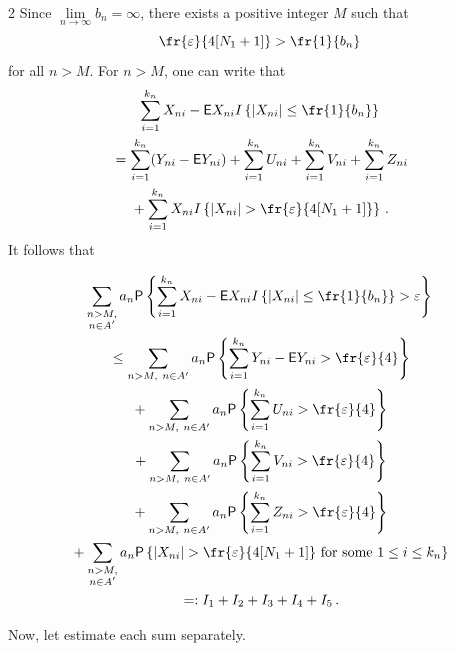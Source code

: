 \begin{multicols}{2}
Since $\lim\limits_{n\to\infty}b_n=\infty$, there exists a positive integer $M$ such that
$$
\fr{\varepsilon}{4[N_1+1]}>\fr{1}{b_n}
$$
for all $n>M$. For $n>M$,  one can write that
\begin{multline*} 
\sum\limits_{i=1}^{k_n} X_{ni}- {\sf E}X_{ni}I\left\{|X_{ni}|\le \fr{1}{b_n}\right\}\\
{} = \sum\limits_{i=1}^{k_n}(Y_{ni}-{\sf E}Y_{ni})+ \sum\limits_{i=1}^{k_n} U_{ni} + 
\sum\limits_{i=1}^{k_n} V_{ni}+ \sum\limits_{i=1}^{k_n} Z_{ni}\\
{}+\sum\limits_{i=1}^{k_n} X_{ni} I\left\{|X_{ni}|>\fr{\varepsilon}{4[N_1+1]}\right\}\,. 
\end{multline*}
It follows that

\noindent
\begin{multline*}
\sum\limits_{\substack{{n>M,}\\ {n \in A'}}}  a_n {\sf P}\left\{
\sum\limits_{i=1}^{k_n} X_{ni}- {\sf E}X_{ni}I\left\{|X_{ni}|\le \fr{1}{b_n}\right\}>\varepsilon\right\}\\
{}\le \sum\limits_{n>M, \ n \in A'} a_n {\sf P}\left\{\sum\limits_{i=1}^{k_n} 
Y_{ni}- {\sf E}Y_{ni}>\fr{\varepsilon}{4} \right\}\\
{}+ \sum\limits_{n>M, \ n \in A'} a_n {\sf P}\left\{\sum\limits_{i=1}^{k_n} U_{ni}>
\fr{\varepsilon}{4}\right\}\\
{}+ \sum\limits_{n>M, \ n \in A'} a_n {\sf P}\left\{\sum\limits_{i=1}^{k_n} V_{ni}>
\fr{\varepsilon}{4 }\right\} \\
{}+ \sum\limits_{n>M, \ n \in A'} a_n {\sf P}\left\{\sum\limits_{i=1}^{k_n} Z_{ni}>
\fr{\varepsilon}{4}\right\}\\
{}+ \sum\limits_{\substack{{n>M,}\\ {n \in A'}}} a_n 
{\sf P}\left\{ |X_{ni}|>\fr{\varepsilon}{4[N_1+1]} 
\mbox{ for some }1\le i\le k_n \right\}\\
{}=:I_1+I_2+I_3+I_4+I_5\,.
\end{multline*}

Now, let estimate each sum separately.


\end{multicols}
